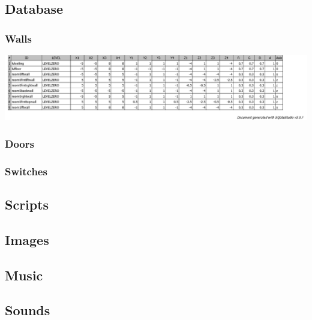 \documentclass{article}
\begin{document}
\subsection{Database}

\subsubsection{Walls}
	\includegraphics[width=18cm]{WALLS}

\subsubsection{Doors}

\subsubsection{Switches}
	 	 				
\subsection{Scripts}
 
\subsection{Images}
 
\subsection{Music}
	 	 	 				
\subsection{Sounds}
	 	 	 				
\end{document}
